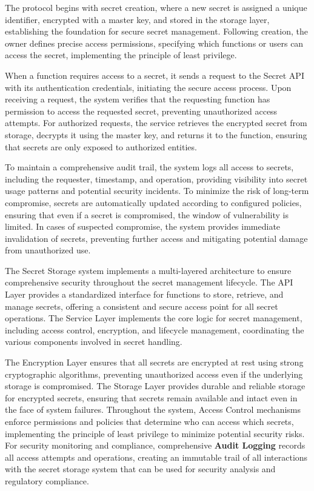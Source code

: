 \documentclass[11pt]{article}
\begin{document}
The protocol begins with secret creation, where a new secret is assigned a unique identifier, encrypted with a master key, and stored in the storage layer, establishing the foundation for secure secret management. Following creation, the owner defines precise access permissions, specifying which functions or users can access the secret, implementing the principle of least privilege.

When a function requires access to a secret, it sends a request to the Secret API with its authentication credentials, initiating the secure access process. Upon receiving a request, the system verifies that the requesting function has permission to access the requested secret, preventing unauthorized access attempts. For authorized requests, the service retrieves the encrypted secret from storage, decrypts it using the master key, and returns it to the function, ensuring that secrets are only exposed to authorized entities.

To maintain a comprehensive audit trail, the system logs all access to secrets, including the requester, timestamp, and operation, providing visibility into secret usage patterns and potential security incidents. To minimize the risk of long-term compromise, secrets are automatically updated according to configured policies, ensuring that even if a secret is compromised, the window of vulnerability is limited. In cases of suspected compromise, the system provides immediate invalidation of secrets, preventing further access and mitigating potential damage from unauthorized use.

The Secret Storage system implements a multi-layered architecture to ensure comprehensive security throughout the secret management lifecycle. The API Layer provides a standardized interface for functions to store, retrieve, and manage secrets, offering a consistent and secure access point for all secret operations. The Service Layer implements the core logic for secret management, including access control, encryption, and lifecycle management, coordinating the various components involved in secret handling.

The Encryption Layer ensures that all secrets are encrypted at rest using strong cryptographic algorithms, preventing unauthorized access even if the underlying storage is compromised. The Storage Layer provides durable and reliable storage for encrypted secrets, ensuring that secrets remain available and intact even in the face of system failures. Throughout the system, Access Control mechanisms enforce permissions and policies that determine who can access which secrets, implementing the principle of least privilege to minimize potential security risks. For security monitoring and compliance, comprehensive \textbf{Audit Logging} records all access attempts and operations, creating an immutable trail of all interactions with the secret storage system that can be used for security analysis and regulatory compliance.
\end{document}
